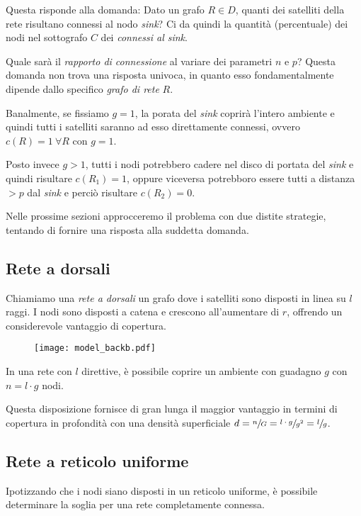 \documentclass[a4paper,12pt]{article}
\theoremstyle{definition}
\begin{document}
Questa risponde alla domanda: Dato un grafo $R \in D$, quanti dei satelliti della rete risultano connessi al nodo \emph{sink}? Ci da quindi la quantità (percentuale) dei nodi nel sottografo $C$ dei \emph{connessi al sink}.

Quale sarà il \emph{rapporto di connessione} al variare dei parametri $n$ e $p$? Questa domanda non trova una risposta univoca, in quanto esso fondamentalmente dipende dallo specifico \emph{grafo di rete} $R$.

Banalmente, se fissiamo $g = 1$, la porata del \emph{sink} coprirà l'intero ambiente e quindi tutti i satelliti saranno ad esso direttamente connessi, ovvero $c(R) = 1 \ \forall R$ con $g = 1$.

Posto invece $g > 1$, tutti i nodi potrebbero cadere nel disco di portata del \emph{sink} e quindi risultare $c(R_1) = 1$, oppure viceversa potrebboro essere tutti a distanza $> p$ dal \emph{sink} e perciò risultare $c(R_2) = 0$.

Nelle prossime sezioni approcceremo il problema con due distite strategie, tentando di fornire una risposta alla suddetta domanda.

\subsection{Rete a dorsali}

Chiamiamo una \emph{rete a dorsali} un grafo dove i satelliti sono disposti in linea su $l$ raggi. I nodi sono disposti a catena e crescono all'aumentare di $r$, offrendo un considerevole vantaggio di copertura.

\begin{figure}[H]
\centering
\texttt{[image: model\_backb.pdf]}
\caption{}
\end{figure}

In una rete con $l$ direttive, è possibile coprire un ambiente con guadagno $g$ con $n = l \cdot g$ nodi.

Questa disposizione fornisce di gran lunga il maggior vantaggio in termini di copertura in profondità con una densità superficiale $d = \sfrac{n}{G} = \sfrac{l \cdot g}{g^2} = \sfrac{l}{g}$.

\subsection{Rete a reticolo uniforme}

Ipotizzando che i nodi siano disposti in un reticolo uniforme, è possibile determinare la soglia per una rete completamente connessa.
\end{document}
